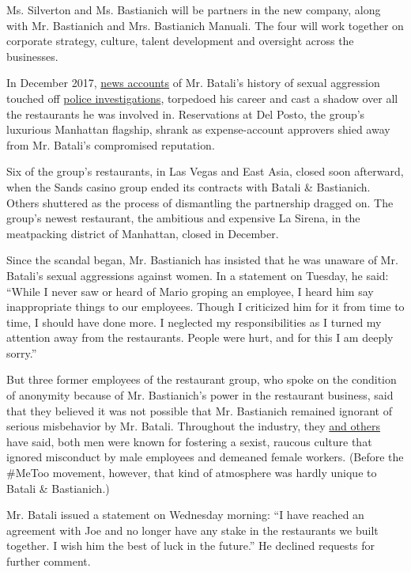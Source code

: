 Ms. Silverton and Ms. Bastianich will be partners in the new company,
along with Mr. Bastianich and Mrs. Bastianich Manuali. The four will
work together on corporate strategy, culture, talent development and
oversight across the businesses.

In December 2017,
\href{https://www.nytimes3xbfgragh.onion/2017/12/11/dining/mario-batali-sexual-misconduct.html}{news
accounts} of Mr. Batali's history of sexual aggression touched off
\href{https://www.nytimes3xbfgragh.onion/2018/05/21/dining/mario-batali-sexual-assault.html}{police
investigations}, torpedoed his career and cast a shadow over all the
restaurants he was involved in. Reservations at Del Posto, the group's
luxurious Manhattan flagship, shrank as expense-account approvers shied
away from Mr. Batali's compromised reputation.

Six of the group's restaurants, in Las Vegas and East Asia, closed soon
afterward, when the Sands casino group ended its contracts with Batali
\& Bastianich. Others shuttered as the process of dismantling the
partnership dragged on. The group's newest restaurant, the ambitious and
expensive La Sirena, in the meatpacking district of Manhattan, closed in
December.

Since the scandal began, Mr. Bastianich has insisted that he was unaware
of Mr. Batali's sexual aggressions against women. In a statement on
Tuesday, he said: ``While I never saw or heard of Mario groping an
employee, I heard him say inappropriate things to our employees. Though
I criticized him for it from time to time, I should have done more. I
neglected my responsibilities as I turned my attention away from the
restaurants. People were hurt, and for this I am deeply sorry.''

But three former employees of the restaurant group, who spoke on the
condition of anonymity because of Mr. Bastianich's power in the
restaurant business, said that they believed it was not possible that
Mr. Bastianich remained ignorant of serious misbehavior by Mr. Batali.
Throughout the industry, they
\href{https://ny.eater.com/2017/12/22/16809430/batali-bastianich-misconduct-restaurant-culture}{and
others} have said, both men were known for fostering a sexist, raucous
culture that ignored misconduct by male employees and demeaned female
workers. (Before the \#MeToo movement, however, that kind of atmosphere
was hardly unique to Batali \& Bastianich.)

Mr. Batali issued a statement on Wednesday morning: ``I have reached an
agreement with Joe and no longer have any stake in the restaurants we
built together. I wish him the best of luck in the future.'' He declined
requests for further comment.

